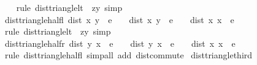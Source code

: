 \begin{isabellebody}
%
\isadelimproof
\ \ %
\endisadelimproof
%
\isatagproof
{}\isamarkupfalse%
\ {\isacharparenleft}{\kern0pt}rule\ dist{\isacharunderscore}{\kern0pt}triangle{\isacharunderscore}{\kern0pt}lt\ {\isacharbrackleft}{\kern0pt}\ z{\isacharequal}{\kern0pt}y{\isacharbrackright}{\kern0pt}{\isacharparenright}{\kern0pt}\ simp%
\endisatagproof
{\isafoldproof}%
%
\isadelimproof
\isanewline
%
\endisadelimproof
\isanewline
{}\isamarkupfalse%
\ dist{\isacharunderscore}{\kern0pt}triangle{\isacharunderscore}{\kern0pt}half{\isacharunderscore}{\kern0pt}l{\isacharcolon}{\kern0pt}\ {\isachardoublequoteopen}dist\ x{}\ y\ {\isacharless}{\kern0pt}\ e\ {\isacharslash}{\kern0pt}\ {}\ {\isasymLongrightarrow}\ dist\ x{}\ y\ {\isacharless}{\kern0pt}\ e\ {\isacharslash}{\kern0pt}\ {}\ {\isasymLongrightarrow}\ dist\ x{}\ x{}\ {\isacharless}{\kern0pt}\ e{\isachardoublequoteclose}\isanewline
%
\isadelimproof
\ \ %
\endisadelimproof
%
\isatagproof
{}\isamarkupfalse%
\ {\isacharparenleft}{\kern0pt}rule\ dist{\isacharunderscore}{\kern0pt}triangle{\isacharunderscore}{\kern0pt}lt\ {\isacharbrackleft}{\kern0pt}\ z{\isacharequal}{\kern0pt}y{\isacharbrackright}{\kern0pt}{\isacharparenright}{\kern0pt}\ simp%
\endisatagproof
{\isafoldproof}%
%
\isadelimproof
\isanewline
%
\endisadelimproof
\isanewline
{}\isamarkupfalse%
\ dist{\isacharunderscore}{\kern0pt}triangle{\isacharunderscore}{\kern0pt}half{\isacharunderscore}{\kern0pt}r{\isacharcolon}{\kern0pt}\ {\isachardoublequoteopen}dist\ y\ x{}\ {\isacharless}{\kern0pt}\ e\ {\isacharslash}{\kern0pt}\ {}\ {\isasymLongrightarrow}\ dist\ y\ x{}\ {\isacharless}{\kern0pt}\ e\ {\isacharslash}{\kern0pt}\ {}\ {\isasymLongrightarrow}\ dist\ x{}\ x{}\ {\isacharless}{\kern0pt}\ e{\isachardoublequoteclose}\isanewline
%
\isadelimproof
\ \ %
\endisadelimproof
%
\isatagproof
{}\isamarkupfalse%
\ {\isacharparenleft}{\kern0pt}rule\ dist{\isacharunderscore}{\kern0pt}triangle{\isacharunderscore}{\kern0pt}half{\isacharunderscore}{\kern0pt}l{\isacharparenright}{\kern0pt}\ {\isacharparenleft}{\kern0pt}simp{\isacharunderscore}{\kern0pt}all\ add{\isacharcolon}{\kern0pt}\ dist{\isacharunderscore}{\kern0pt}commute{\isacharparenright}{\kern0pt}%
\endisatagproof
{\isafoldproof}%
%
\isadelimproof
\isanewline
%
\endisadelimproof
\isanewline
{}\isamarkupfalse%
\ dist{\isacharunderscore}{\kern0pt}triangle{\isacharunderscore}{\kern0pt}third{\isacharcolon}{\kern0pt}\isanewline

\end{isabellebody}

